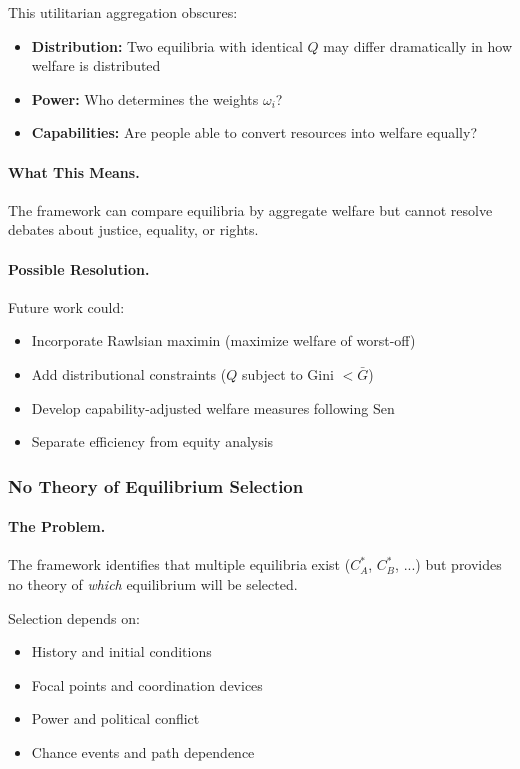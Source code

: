 \documentclass[12pt,a4paper]{article}
\begin{document}
This utilitarian aggregation obscures:
\begin{itemize}
  \item \textbf{Distribution:} Two equilibria with identical $Q$ may differ dramatically 
        in how welfare is distributed
  \item \textbf{Power:} Who determines the weights $\omega_i$?
  \item \textbf{Capabilities:} Are people able to convert resources into welfare equally?
\end{itemize}

\paragraph{What This Means.}
The framework can compare equilibria by aggregate welfare
but cannot resolve debates about justice, equality, or rights.

\paragraph{Possible Resolution.}
Future work could:
\begin{itemize}
  \item Incorporate Rawlsian maximin (maximize welfare of worst-off)
  \item Add distributional constraints ($Q$ subject to Gini $< \bar{G}$)
  \item Develop capability-adjusted welfare measures following Sen
  \item Separate efficiency from equity analysis
\end{itemize}

\subsubsection{No Theory of Equilibrium Selection}

\paragraph{The Problem.}
The framework identifies that multiple equilibria exist ($C^*_A$, $C^*_B$, ...)
but provides no theory of \emph{which} equilibrium will be selected.

Selection depends on:
\begin{itemize}
  \item History and initial conditions
  \item Focal points and coordination devices
  \item Power and political conflict
  \item Chance events and path dependence
\end{itemize}
\end{document}
